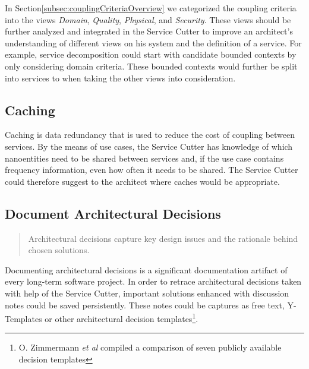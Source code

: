 In Section\ref{subsec:couplingCriteriaOverview} we categorized the coupling criteria into the views \textit{Domain}, \textit{Quality}, \textit{Physical}, and \textit{Security}. These views should be further analyzed and integrated in the Service Cutter to improve an architect's understanding of different views on his system and the definition of a service. For example, service decomposition could start with candidate bounded contexts by only considering domain criteria. These bounded contexts would further be split into services to when taking the other views into consideration.


\subsection{Caching}

Caching is data redundancy that is used to reduce the cost of coupling between services. By the means of use cases, the Service Cutter has knowledge of which nanoentities need to be shared between services and, if the use case contains frequency information, even how often it needs to be shared. The Service Cutter could therefore suggest to the architect where caches would be appropriate.

\subsection{Document Architectural Decisions}

\begin{quote}
	Architectural decisions capture key design issues and the rationale behind chosen solutions.\cite{zioAD}
\end{quote}

Documenting architectural decisions is a significant documentation artifact of every long-term software project. In order to retrace architectural decisions taken with help of the Service Cutter, important solutions enhanced with discussion notes could be saved persistently. These notes could be captures as free text, Y-Templates\cite{zimmermann2012yTemplate} or other architectural decision templates\footnote{O. Zimmermann \textit{et al} compiled a comparison of seven publicly available decision templates\cite[p. 3]{zimmermann2015architectural}}.

